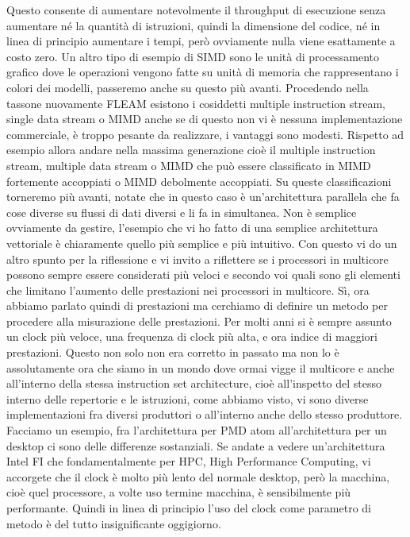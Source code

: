 Questo consente di aumentare notevolmente il throughput di esecuzione senza aumentare né la quantità di istruzioni, quindi la dimensione del codice, né in linea di principio aumentare i tempi, però ovviamente nulla viene esattamente a costo zero.
Un altro tipo di esempio di SIMD sono le unità di processamento grafico dove le operazioni vengono fatte su unità di memoria che rappresentano i colori dei modelli, passeremo anche su questo più avanti.
Procedendo nella tassone nuovamente FLEAM esistono i cosiddetti multiple instruction stream, single data stream o MIMD anche se di questo non vi è nessuna implementazione commerciale, è troppo pesante da realizzare, i vantaggi sono modesti.
Rispetto ad esempio allora andare nella massima generazione cioè il multiple instruction stream, multiple data stream o MIMD che può essere classificato in MIMD fortemente accoppiati o MIMD debolmente accoppiati.
Su queste classificazioni torneremo più avanti, notate che in questo caso è un'architettura parallela che fa cose diverse su flussi di dati diversi e li fa in simultanea.
Non è semplice ovviamente da gestire, l'esempio che vi ho fatto di una semplice architettura vettoriale è chiaramente quello più semplice e più intuitivo.
Con questo vi do un altro spunto per la riflessione e vi invito a riflettere se i processori in multicore possono sempre essere considerati più veloci e secondo voi quali sono gli elementi che limitano l'aumento delle prestazioni nei processori in multicore.
Sì, ora abbiamo parlato quindi di prestazioni ma cerchiamo di definire un metodo per procedere alla misurazione delle prestazioni.
Per molti anni si è sempre assunto un clock più veloce, una frequenza di clock più alta, e ora indice di maggiori prestazioni.
Questo non solo non era corretto in passato ma non lo è assolutamente ora che siamo in un mondo dove ormai vigge il multicore e anche all'interno della stessa instruction set architecture, cioè all'inspetto del stesso interno delle repertorie e le istruzioni, come abbiamo visto, vi sono diverse implementazioni fra diversi produttori o all'interno anche dello stesso produttore.
Facciamo un esempio, fra l'architettura per PMD atom all'architettura per un desktop ci sono delle differenze sostanziali.
Se andate a vedere un'architettura Intel FI che fondamentalmente per HPC, High Performance Computing, vi accorgete che il clock è molto più lento del normale desktop, però la macchina, cioè quel processore, a volte uso termine macchina, è sensibilmente più performante.
Quindi in linea di principio l'uso del clock come parametro di metodo è del tutto insignificante oggigiorno.
